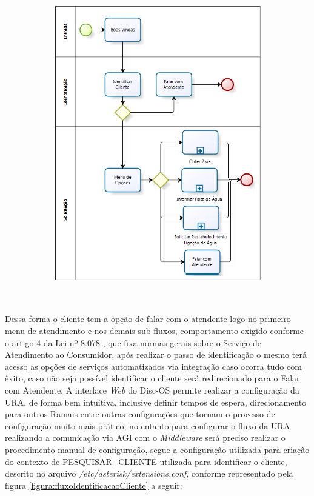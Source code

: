 \begin{figure}[H]
	\caption{\textbf{Diagrama do Fluxo da Unidade de Resposta Audível}}
	\label{figura:fluxoURA}	
		\begin{subfigure}[H]{\textwidth}
			\centering
			\includegraphics{figuras/fluxo_ura.png}
		\end{subfigure}
	\\[6pt]
	\fontsize{10}{12}\selectfont {Fonte: Autoria Própria.}
\end{figure}


Dessa forma o cliente tem a opção de falar com o atendente logo no primeiro menu de atendimento e nos demais sub fluxos, comportamento exigido conforme o artigo 4 da Lei nº 8.078 \cite{leiAtendimentoAoConsumidor}, que fixa normas gerais sobre o Serviço de Atendimento ao Consumidor, após realizar o passo de identificação o mesmo terá acesso as opções de serviços automatizados via integração caso ocorra tudo com êxito, caso não seja possível identificar o cliente será redirecionado para o Falar com Atendente.
A interface \textit{Web} do Disc-OS permite realizar a configuração da URA, de forma bem intuitiva, inclusive definir tempos de espera, direcionamento para outros Ramais entre outras configurações que tornam o processo de configuração muito mais prático, no entanto para configurar o fluxo da URA realizando a comunicação via AGI com o \textit{Middleware} será preciso realizar o procedimento manual de configuração, segue a configuração utilizada para criação do contexto de PESQUISAR\_CLIENTE utilizada para identificar o cliente, descrito no arquivo \textit{/etc/asterisk/extensions.conf}, conforme representado pela figura \ref{figura:fluxoIdentificacaoCliente} a seguir:


